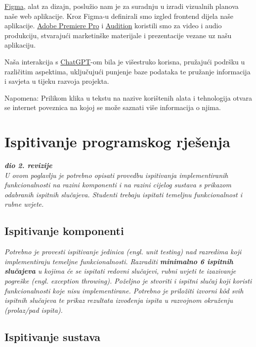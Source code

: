 \href{https://www.figma.com}{Figma}, alat za dizajn, poslužio nam je za suradnju u izradi vizualnih planova naše web aplikacije. Kroz Figma-u definirali smo izgled frontend dijela naše aplikacije. \href{https://www.adobe.com/products/premiere.html}{Adobe Premiere Pro} i \href{https://www.adobe.com/products/audition.html}{Audition} koristili smo za video i audio produkciju, stvarajući marketinške materijale i prezentacije vezane uz našu aplikaciju.

Naša interakcija s \href{https://openai.com/gpt}{ChatGPT}-om bila je višestruko korisna, pružajući podršku u različitim aspektima, uključujući punjenje baze podataka te pružanje informacija i savjeta u tijeku razvoja projekta. 


 		Napomena: Prilikom klika u tekstu na nazive korištenih alata i tehnologija otvara se internet poveznica na kojoj se može saznati više informacija o njima.
			\eject 
		
	
		\section{Ispitivanje programskog rješenja}
			
			\textbf{\textit{dio 2. revizije}}\\
			
			 \textit{U ovom poglavlju je potrebno opisati provedbu ispitivanja implementiranih funkcionalnosti na razini komponenti i na razini cijelog sustava s prikazom odabranih ispitnih slučajeva. Studenti trebaju ispitati temeljnu funkcionalnost i rubne uvjete.}
	
			
			\subsection{Ispitivanje komponenti}
			\textit{Potrebno je provesti ispitivanje jedinica (engl. unit testing) nad razredima koji implementiraju temeljne funkcionalnosti. Razraditi \textbf{minimalno 6 ispitnih slučajeva} u kojima će se ispitati redovni slučajevi, rubni uvjeti te izazivanje pogreške (engl. exception throwing). Poželjno je stvoriti i ispitni slučaj koji koristi funkcionalnosti koje nisu implementirane. Potrebno je priložiti izvorni kôd svih ispitnih slučajeva te prikaz rezultata izvođenja ispita u razvojnom okruženju (prolaz/pad ispita). }
			
			
			
			\subsection{Ispitivanje sustava}
			
